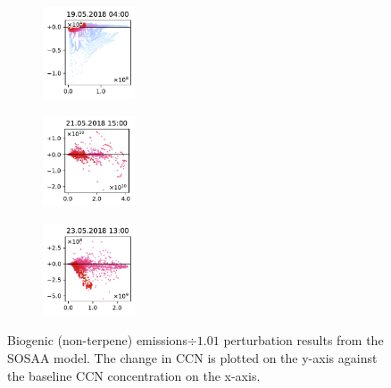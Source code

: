 \begin{figure}[H]
    \begin{subfigure}
        \centering
        \includegraphics[width=0.30\textwidth,valign=t]{evaluation/figures/perturbations/perturbation-19.05.2018:04.00-biogenic-div-1.01.pdf}
    \end{subfigure}
    \begin{subfigure}
        \centering
        \includegraphics[width=0.30\textwidth,valign=t]{evaluation/figures/perturbations/perturbation-21.05.2018:15.00-biogenic-div-1.01.pdf}
    \end{subfigure}
    \begin{subfigure}
        \centering
        \includegraphics[width=0.30\textwidth,valign=t]{evaluation/figures/perturbations/perturbation-23.05.2018:13.00-biogenic-div-1.01.pdf}
    \end{subfigure}

    \caption[Biogenic emissions$\div 1.01$ perturbation SOSAA results]{Biogenic (non-terpene) emissions$\div 1.01$ perturbation results from the SOSAA model. The change in CCN is plotted on the y-axis against the baseline CCN concentration on the x-axis.}
    \label{fig:sosaa-perturbation-biogenic-div-1.01}
\end{figure}

